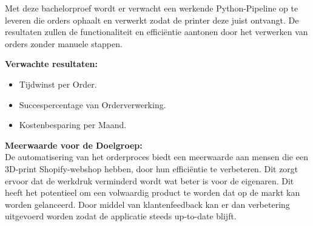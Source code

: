 Met deze bachelorproef wordt er verwacht een werkende Python-Pipeline op te leveren die orders ophaalt en verwerkt zodat de printer deze juist ontvangt. De resultaten zullen de functionaliteit en efficiëntie aantonen door het verwerken van orders zonder manuele stappen.

\vspace{1em}
\textbf{Verwachte resultaten:}
\begin{itemize}
\item Tijdwinst per Order.
\item Succespercentage van Orderverwerking.
\item Kostenbesparing per Maand.
\end{itemize}

\textbf{Meerwaarde voor de Doelgroep:}\\

De automatisering van het orderproces biedt een meerwaarde aan mensen die een 3D-print Shopify-webshop hebben, door hun efficiëntie te verbeteren. Dit zorgt ervoor dat de werkdruk verminderd wordt wat beter is voor de eigenaren. Dit heeft het potentieel om een volwaardig product te worden dat op de markt kan worden gelanceerd. Door middel van klantenfeedback kan er dan verbetering uitgevoerd worden zodat de applicatie steeds up-to-date blijft.








